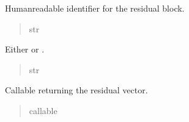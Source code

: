 \documentclass[letterpaper,10pt,english,openany,oneside]{sphinxmanual}
\begin{document}
\begin{fulllineitems}
\begin{fulllineitems}
\label{\detokenize{api/core/jaxmodel/constraints:jaxmodel.constraints.ConstraintEntry.name}}
\pysigstartsignatures
{}
\pysigstopsignatures
\sphinxAtStartPar
Human\sphinxhyphen{}readable identifier for the residual block.
\begin{quote}\begin{description}
\sphinxAtStartPar
str

\end{description}\end{quote}

\end{fulllineitems}


\begin{fulllineitems}
\label{\detokenize{api/core/jaxmodel/constraints:jaxmodel.constraints.ConstraintEntry.kind}}
\pysigstartsignatures
{}
\pysigstopsignatures
\sphinxAtStartPar
Either  or .
\begin{quote}\begin{description}
\sphinxAtStartPar
str

\end{description}\end{quote}

\end{fulllineitems}


\begin{fulllineitems}
\label{\detokenize{api/core/jaxmodel/constraints:jaxmodel.constraints.ConstraintEntry.fun}}
\pysigstartsignatures
{}
\pysigstopsignatures
\sphinxAtStartPar
Callable returning the residual vector.
\begin{quote}\begin{description}
\sphinxAtStartPar
callable

\end{description}\end{quote}


\end{fulllineitems}
\end{fulllineitems}
\end{document}
